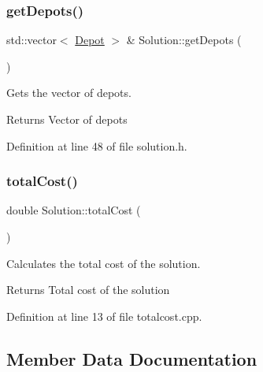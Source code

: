 \mbox{\label{class_solution_ab950712d080e8fcfda4d7f5b7126f1e6}} 
\subsubsection{\texorpdfstring{get\+Depots()}{getDepots()}}
{\footnotesize\ttfamily std\+::vector$<$ \hyperlink{class_depot}{Depot} $>$ \& Solution\+::get\+Depots (\begin{DoxyParamCaption}{ }\end{DoxyParamCaption})\hspace{0.3cm}{\ttfamily [inline]}}

Gets the vector of depots. \begin{DoxyReturn}{Returns}
Vector of depots 
\end{DoxyReturn}


Definition at line 48 of file solution.\+h.

\mbox{\label{class_solution_a227aaabdf34fbd2e01283728a5a344fe}} 
\subsubsection{\texorpdfstring{total\+Cost()}{totalCost()}}
{\footnotesize\ttfamily double Solution\+::total\+Cost (\begin{DoxyParamCaption}{ }\end{DoxyParamCaption})}



Calculates the total cost of the solution. 

\begin{DoxyReturn}{Returns}
Total cost of the solution 
\end{DoxyReturn}


Definition at line 13 of file totalcost.\+cpp.



\subsection{Member Data Documentation}
\mbox{\label{class_solution_aa639f6f348d3e2014491d62eeccd1d2a}} 
